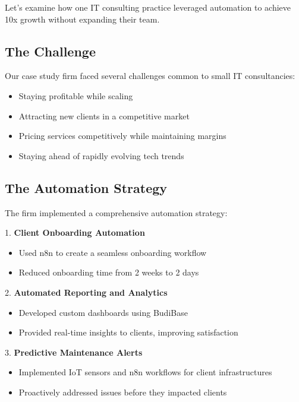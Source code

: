 Let's examine how one IT consulting practice leveraged automation to achieve 10x growth without expanding their team.

\subsection{The Challenge}

Our case study firm faced several challenges common to small IT consultancies:
\begin{itemize}
    \item Staying profitable while scaling
    \item Attracting new clients in a competitive market
    \item Pricing services competitively while maintaining margins
    \item Staying ahead of rapidly evolving tech trends
\end{itemize}

\subsection{The Automation Strategy}

The firm implemented a comprehensive automation strategy:

1. \textbf{Client Onboarding Automation}
\begin{itemize}
    \item Used n8n to create a seamless onboarding workflow
    \item Reduced onboarding time from 2 weeks to 2 days
\end{itemize}

2. \textbf{Automated Reporting and Analytics}
\begin{itemize}
    \item Developed custom dashboards using BudiBase
    \item Provided real-time insights to clients, improving satisfaction
\end{itemize}

3. \textbf{Predictive Maintenance Alerts}
\begin{itemize}
    \item Implemented IoT sensors and n8n workflows for client infrastructures
    \item Proactively addressed issues before they impacted clients
\end{itemize}

